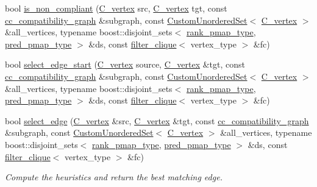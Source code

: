\begin{DoxyCompactItemize}
\item 
bool \hyperlink{classTS__based__clique__covering_a5a3e99dae13279b217976fba856fb30d}{is\+\_\+non\+\_\+compliant} (\hyperlink{clique__covering__graph_8hpp_a9cb45047ea8c5ed95a8cfa90494345aa}{C\+\_\+vertex} src, \hyperlink{clique__covering__graph_8hpp_a9cb45047ea8c5ed95a8cfa90494345aa}{C\+\_\+vertex} tgt, const \hyperlink{clique__covering__graph_8hpp_aa88e9419fe776ef37020cacd507cc4ad}{cc\+\_\+compatibility\+\_\+graph} \&subgraph, const \hyperlink{classCustomUnorderedSet}{Custom\+Unordered\+Set}$<$ \hyperlink{clique__covering__graph_8hpp_a9cb45047ea8c5ed95a8cfa90494345aa}{C\+\_\+vertex} $>$ \&all\+\_\+vertices, typename boost\+::disjoint\+\_\+sets$<$ \hyperlink{clique__covering__graph_8hpp_af170aff46b9e4328f1ad9b119cf78b4a}{rank\+\_\+pmap\+\_\+type}, \hyperlink{clique__covering__graph_8hpp_af4c454ac367cfb12e29c98e6bc942a06}{pred\+\_\+pmap\+\_\+type} $>$ \&ds, const \hyperlink{structfilter__clique}{filter\+\_\+clique}$<$ vertex\+\_\+type $>$ \&fc)
\item 
bool \hyperlink{classTS__based__clique__covering_a72ac374b2e8dd3f983fdecff9eb65aa3}{select\+\_\+edge\+\_\+start} (\hyperlink{clique__covering__graph_8hpp_a9cb45047ea8c5ed95a8cfa90494345aa}{C\+\_\+vertex} source, \hyperlink{clique__covering__graph_8hpp_a9cb45047ea8c5ed95a8cfa90494345aa}{C\+\_\+vertex} \&tgt, const \hyperlink{clique__covering__graph_8hpp_aa88e9419fe776ef37020cacd507cc4ad}{cc\+\_\+compatibility\+\_\+graph} \&subgraph, const \hyperlink{classCustomUnorderedSet}{Custom\+Unordered\+Set}$<$ \hyperlink{clique__covering__graph_8hpp_a9cb45047ea8c5ed95a8cfa90494345aa}{C\+\_\+vertex} $>$ \&all\+\_\+vertices, typename boost\+::disjoint\+\_\+sets$<$ \hyperlink{clique__covering__graph_8hpp_af170aff46b9e4328f1ad9b119cf78b4a}{rank\+\_\+pmap\+\_\+type}, \hyperlink{clique__covering__graph_8hpp_af4c454ac367cfb12e29c98e6bc942a06}{pred\+\_\+pmap\+\_\+type} $>$ \&ds, const \hyperlink{structfilter__clique}{filter\+\_\+clique}$<$ vertex\+\_\+type $>$ \&fc)
\item 
bool \hyperlink{classTS__based__clique__covering_a5a637fe39f725d7486e89fb3f773476f}{select\+\_\+edge} (\hyperlink{clique__covering__graph_8hpp_a9cb45047ea8c5ed95a8cfa90494345aa}{C\+\_\+vertex} \&src, \hyperlink{clique__covering__graph_8hpp_a9cb45047ea8c5ed95a8cfa90494345aa}{C\+\_\+vertex} \&tgt, const \hyperlink{clique__covering__graph_8hpp_aa88e9419fe776ef37020cacd507cc4ad}{cc\+\_\+compatibility\+\_\+graph} \&subgraph, const \hyperlink{classCustomUnorderedSet}{Custom\+Unordered\+Set}$<$ \hyperlink{clique__covering__graph_8hpp_a9cb45047ea8c5ed95a8cfa90494345aa}{C\+\_\+vertex} $>$ \&all\+\_\+vertices, typename boost\+::disjoint\+\_\+sets$<$ \hyperlink{clique__covering__graph_8hpp_af170aff46b9e4328f1ad9b119cf78b4a}{rank\+\_\+pmap\+\_\+type}, \hyperlink{clique__covering__graph_8hpp_af4c454ac367cfb12e29c98e6bc942a06}{pred\+\_\+pmap\+\_\+type} $>$ \&ds, const \hyperlink{structfilter__clique}{filter\+\_\+clique}$<$ vertex\+\_\+type $>$ \&fc)
\begin{DoxyCompactList}\small\item\em Compute the heuristics and return the best matching edge. \end{DoxyCompactList}\end{DoxyCompactItemize}
